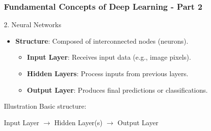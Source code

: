 \documentclass[aspectratio=169]{beamer}
\begin{document}
\begin{frame}[fragile]
    \frametitle{Fundamental Concepts of Deep Learning - Part 2}
    \begin{block}{2. Neural Networks}
        \begin{itemize}
            \item \textbf{Structure}: Composed of interconnected nodes (neurons).
            \begin{itemize}
                \item \textbf{Input Layer}: Receives input data (e.g., image pixels).
                \item \textbf{Hidden Layers}: Process inputs from previous layers.
                \item \textbf{Output Layer}: Produces final predictions or classifications.
            \end{itemize}
        \end{itemize}
    \end{block}
    
    \begin{block}{Illustration}
        Basic structure: 
        \begin{center}
            Input Layer $\rightarrow$ Hidden Layer(s) $\rightarrow$ Output Layer
        \end{center}
    \end{block}
\end{frame}
\end{document}
